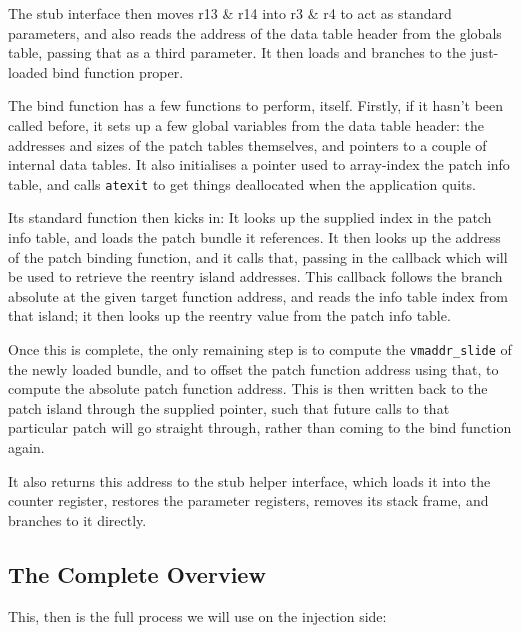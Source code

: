 \documentclass[english]{article}
\begin{document}
The stub interface then moves r13 \& r14 into r3 \& r4 to act as standard parameters, and also reads the address of the data table header from the globals table, passing that as a third parameter. It then loads and branches to the just-loaded bind function proper.

The bind function has a few functions to perform, itself. Firstly, if it hasn't been called before, it sets up a few global variables from the data table header: the addresses and sizes of the patch tables themselves, and pointers to a couple of internal data tables. It also initialises a pointer used to array-index the patch info table, and calls \texttt{atexit} to get things deallocated when the application quits.

Its standard function then kicks in: It looks up the supplied index in the patch info table, and loads the patch bundle it references. It then looks up the address of the patch binding function, and it calls that, passing in the callback which will be used to retrieve the reentry island addresses. This callback follows the branch absolute at the given target function address, and reads the info table index from that island; it then looks up the reentry value from the patch info table.

Once this is complete, the only remaining step is to compute the \texttt{vmaddr\_slide} of the newly loaded bundle, and to offset the patch function address using that, to compute the absolute patch function address. This is then written back to the patch island through the supplied pointer, such that future calls to that particular patch will go straight through, rather than coming to the bind function again.

It also returns this address to the stub helper interface, which loads it into the counter register, restores the parameter registers, removes its stack frame, and branches to it directly.


\subsection{The Complete Overview}
This, then is the full process we will use on the injection side:
\end{document}
